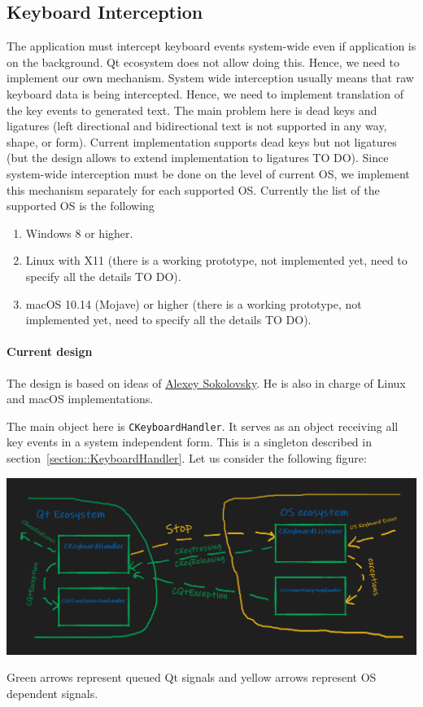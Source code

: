 \documentclass{article}
\begin{document}
\subsection{Keyboard Interception}

The application must intercept keyboard events system-wide even if application is on the background. Qt ecosystem does not allow doing this. Hence, we need to implement our own mechanism. System wide interception usually means that raw keyboard data is being intercepted. Hence, we need to implement translation of the key events to generated text. The main problem here is dead keys and ligatures (left directional and bidirectional text is not supported in any way, shape, or form). Current implementation supports dead keys but not ligatures (but the design allows to extend implementation to ligatures TO DO). Since system-wide interception must be done on the level of current OS, we implement this mechanism separately for each supported OS. Currently the list of the supported OS is the following
\begin{enumerate}
\item Windows 8 or higher.
\item Linux with X11 (there is a working prototype, not implemented yet, need to specify all the details TO DO).
\item macOS 10.14 (Mojave) or higher (there is a working prototype, not implemented yet, need to specify all the details TO DO).
\end{enumerate}

\paragraph{Current design}

The design is based on ideas of \href{https://github.com/asokol123}{Alexey Sokolovsky}. He is also in charge of Linux and macOS implementations.

The main object here is \verb"CKeyboardHandler". It serves as an object receiving all key events in a system independent form. This is a singleton described in section~\ref{section::KeyboardHandler}. Let us consider the following figure:
\begin{center}
\includegraphics[scale = 0.5]{Figures/KeyboardInterception.png}

Green arrows represent queued Qt signals and yellow arrows represent OS dependent signals.
\end{center}
\end{document}
